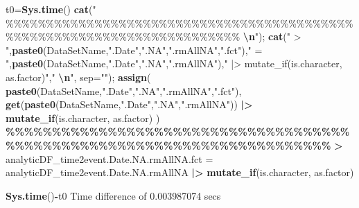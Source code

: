 \documentclass[
]{article}
\newenvironment{Shaded}{\begin{snugshade}}{\end{snugshade}}
\newcommand{\AttributeTok}[1]{\textcolor[rgb]{0.13,0.29,0.53}{#1}}
\newcommand{\ErrorTok}[1]{\textcolor[rgb]{0.64,0.00,0.00}{\textbf{#1}}}
\newcommand{\FloatTok}[1]{\textcolor[rgb]{0.00,0.00,0.81}{#1}}
\newcommand{\FunctionTok}[1]{\textcolor[rgb]{0.13,0.29,0.53}{\textbf{#1}}}
\newcommand{\NormalTok}[1]{#1}
\newcommand{\OtherTok}[1]{\textcolor[rgb]{0.56,0.35,0.01}{#1}}
\newcommand{\SpecialCharTok}[1]{\textcolor[rgb]{0.81,0.36,0.00}{\textbf{#1}}}
\newcommand{\StringTok}[1]{\textcolor[rgb]{0.31,0.60,0.02}{#1}}
\begin{document}
\begin{Shaded}
\begin{Highlighting}[]
  
\NormalTok{t0}\OtherTok{=}\FunctionTok{Sys.time}\NormalTok{()}
\FunctionTok{cat}\NormalTok{(}\StringTok{"    \%\%\%\%\%\%\%\%\%\%\%\%\%\%\%\%\%\%\%\%\%\%\%\%\%\%\%\%\%\%\%\%\%\%\%\%\%\%\%\%\%\%\%\%\%\%\%\%\%\%\%\%\%\%\%\%\%\%\%\%\%\%\%\%\%\%\%\%\%\%\%\%    }\SpecialCharTok{\textbackslash{}n}\StringTok{"}\NormalTok{); }\FunctionTok{cat}\NormalTok{(}\StringTok{" \textgreater{} "}\NormalTok{,}\FunctionTok{paste0}\NormalTok{(DataSetName,}\StringTok{".Date"}\NormalTok{,}\StringTok{".NA"}\NormalTok{,}\StringTok{".rmAllNA"}\NormalTok{,}\StringTok{".fct"}\NormalTok{),}\StringTok{" = "}\NormalTok{,}\FunctionTok{paste0}\NormalTok{(DataSetName,}\StringTok{".Date"}\NormalTok{,}\StringTok{".NA"}\NormalTok{,}\StringTok{".rmAllNA"}\NormalTok{),}\StringTok{" |\textgreater{} mutate\_if(is.character, as.factor)"}\NormalTok{,}\StringTok{"  }\SpecialCharTok{\textbackslash{}n}\StringTok{"}\NormalTok{, }\AttributeTok{sep=}\StringTok{""}\NormalTok{); }\FunctionTok{assign}\NormalTok{( }\FunctionTok{paste0}\NormalTok{(DataSetName,}\StringTok{".Date"}\NormalTok{,}\StringTok{".NA"}\NormalTok{,}\StringTok{".rmAllNA"}\NormalTok{,}\StringTok{".fct"}\NormalTok{), }\FunctionTok{get}\NormalTok{(}\FunctionTok{paste0}\NormalTok{(DataSetName,}\StringTok{".Date"}\NormalTok{,}\StringTok{".NA"}\NormalTok{,}\StringTok{".rmAllNA"}\NormalTok{)) }\SpecialCharTok{|\textgreater{}} \FunctionTok{mutate\_if}\NormalTok{(is.character, as.factor) )}
    \SpecialCharTok{\%\%\%\%\%\%\%\%\%\%\%\%\%\%\%\%\%\%\%\%\%\%\%\%\%\%\%\%\%\%\%\%\%\%\%\%\%\%\%\%\%\%\%\%\%\%\%\%\%\%\%\%\%\%\%\%\%\%\%\%\%\%\%\%\%\%\%\%\%\%\%\%}    
 \ErrorTok{\textgreater{}}\NormalTok{ analyticDF\_time2event.Date.NA.rmAllNA.fct }\OtherTok{=}\NormalTok{ analyticDF\_time2event.Date.NA.rmAllNA }\SpecialCharTok{|\textgreater{}} \FunctionTok{mutate\_if}\NormalTok{(is.character, as.factor)  }
\end{Highlighting}
\end{Shaded}

\begin{Shaded}
\begin{Highlighting}[]
\FunctionTok{Sys.time}\NormalTok{()}\SpecialCharTok{{-}}\NormalTok{t0}
\NormalTok{Time difference of }\FloatTok{0.003987074}\NormalTok{ secs}
\end{Highlighting}
\end{Shaded}
\end{document}

